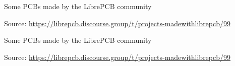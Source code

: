 
\begin{frame}[noframenumbering]{\secname}

  Some PCBs made by the LibrePCB community \faChild\faChild\faChild

  \begin{center}

    \tiny Source:
    \url{https://librepcb.discourse.group/t/projects-madewithlibrepcb/99}
  \end{center}

\end{frame}


\begin{frame}[noframenumbering]{\secname}

  Some PCBs made by the LibrePCB community \faChild\faChild\faChild

  \begin{center}

    \tiny Source:
    \url{https://librepcb.discourse.group/t/projects-madewithlibrepcb/99}
  \end{center}

\end{frame}

